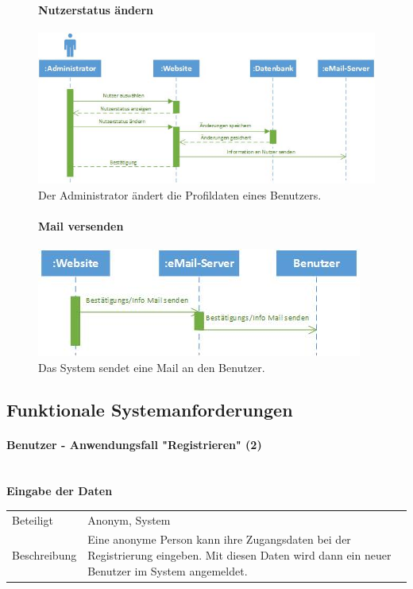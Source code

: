 \documentclass[12pt,a4paper]{article}
\begin{document}
\begin{figure}[H]
	\centering
	\paragraph{Nutzerstatus ändern}
	\includegraphics[width=\textwidth]{Bilder/Sequenzdiagramme/NutzerstatusAendern1.jpg}
	\caption{Der Administrator ändert die Profildaten eines Benutzers.}
	\label{SzNutzerstatusAendern}
\end{figure}

\begin{figure}[H]
	\centering
	\paragraph{Mail versenden}
	\includegraphics[width=\textwidth]{Bilder/Sequenzdiagramme/MailVersenden1.jpg}
	\caption{Das System sendet eine Mail an den Benutzer.}
	\label{SzMailVersenden}
\end{figure}

\subsection{Funktionale Systemanforderungen}
\paragraph{Benutzer - Anwendungsfall "Registrieren" (2)}\mbox{}\\
\textbf{Eingabe der Daten}\\
\begin{tabular}{l| p{12cm}}
	\hline 
	Beteiligt & Anonym, System \\ 
	Beschreibung & Eine anonyme Person kann ihre Zugangsdaten bei der Registrierung eingeben. Mit diesen Daten wird dann ein neuer Benutzer im System angemeldet.\\ 
\end{tabular}\\
\end{document}
